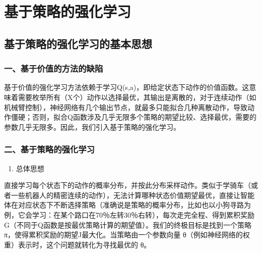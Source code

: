 \hypertarget{ux57faux4e8eux7b56ux7565ux7684ux5f3aux5316ux5b66ux4e60}{%
\chapter{基于策略的强化学习}\label{ux57faux4e8eux7b56ux7565ux7684ux5f3aux5316ux5b66ux4e60}}

\hypertarget{ux57faux4e8eux7b56ux7565ux7684ux5f3aux5316ux5b66ux4e60ux7684ux57faux672cux601dux60f3}{%
\section{基于策略的强化学习的基本思想}\label{ux57faux4e8eux7b56ux7565ux7684ux5f3aux5316ux5b66ux4e60ux7684ux57faux672cux601dux60f3}}

\hypertarget{ux4e00ux57faux4e8eux4ef7ux503cux7684ux65b9ux6cd5ux7684ux7f3aux9677}{%
\subsection{一、基于价值的方法的缺陷}\label{ux4e00ux57faux4e8eux4ef7ux503cux7684ux65b9ux6cd5ux7684ux7f3aux9677}}

基于价值的强化学习方法依赖于学习Q(s,a)，即给定状态下动作的价值函数。这意味着需要枚举所有（X个）动作以选择最优，其输出是离散的，对于连续动作（如机械臂控制），神经网络有几个输出节点，就最多只能拟合几种离散动作，导致动作僵硬；否则，拟合Q函数涉及几乎无限多个策略的期望比较、选择最优，需要的参数几乎无限多。因此，我们引入基于策略的强化学习。

\hypertarget{ux4e8cux57faux4e8eux7b56ux7565ux7684ux5f3aux5316ux5b66ux4e60}{%
\subsection{二、基于策略的强化学习}\label{ux4e8cux57faux4e8eux7b56ux7565ux7684ux5f3aux5316ux5b66ux4e60}}

\begin{enumerate}
\def\labelenumi{\arabic{enumi}.}
\tightlist
\item
  总体思想
\end{enumerate}

直接学习每个状态下的动作的概率分布，并按此分布采样动作。类似于学骑车（或者一些机器人的精密连续的动作），无法计算哪种状态价值期望最优，直接让智能体在对应状态下不断选择策略（准确说是策略的概率分布，比如也以小狗寻路为例，它会学习：在某个路口在70％左转30％右转），每次走完全程、得到累积奖励G（不同于Q函数是按最优策略计算的期望值）。我们的终极目标是找到一个策略π，使得累积奖励的期望J最大化。当策略由一个参数向量 θ（例如神经网络的权重）表示时，这个问题就转化为寻找最优的 θ。

